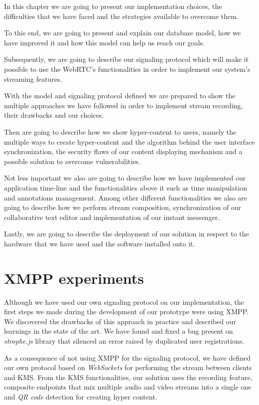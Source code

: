 
In this chapter we are going to present our implementation choices, the difficulties that we have faced and the strategies available to overcome them.

To this end, we are going to present and explain our database model, how we have improved it and how this model can help us reach our goals. 

Subsequently, we are going to describe our signaling protocol which will make it possible to use the \ac{WebRTC}'s functionalities in order to implement our system's streaming features.

With the model and signaling protocol defined we are prepared to show the multiple approaches we have followed in order to implement stream recording, their drawbacks and our choices.

Then are going to describe how we show hyper-content to users, namely the multiple ways to create hyper-content and the algorithm behind the user interface synchronization, the security flaws of our content displaying mechanism and a possible solution to overcome vulnerabilities. 

Not less important we also are going to describe how we have implemented our application time-line and the functionalities above it such as time manipulation and annotations management. Among other different functionalities we also are going to describe how we perform stream composition, synchronization of our collaborative text editor and implementation of our instant messenger.

Lastly, we are going to describe the deployment of our solution in respect to the hardware that we have used and the software installed onto it.




\section{XMPP experiments}
Although we have used our own signaling protocol on our implementation, the first steps we made during the development of our prototype were using \ac{XMPP}. We discovered the drawbacks of this approach in practice and described our learnings in the state of the art. We have found and fixed a bug present on \emph{strophe.js} library that silenced an error raised by duplicated user registrations.

As a consequence of not using \ac{XMPP} for the signaling protocol, we have defined our own protocol based on \emph{WebSockets} for performing the stream between clients and \ac{KMS}. From the \ac{KMS} functionalities, our solution uses the recording feature, composite endpoints that mix multiple audio and video streams into a single one and \emph{QR code} detection for creating hyper content.





